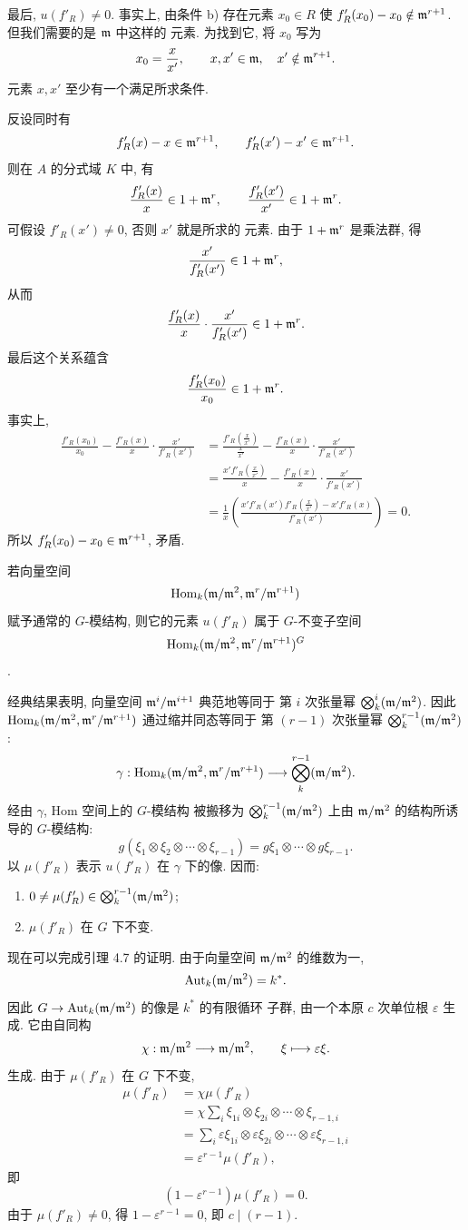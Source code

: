 最后, $u(f'_R)\ne0$. 事实上, 由条件 b) 存在元素
$x_0\in R$ 使 $f'_R(x_0)-x_0\notin\mathfrak m^{r+1}$. 但我们需要的是 $\mathfrak m$ 中这样的
元素. 为找到它, 将 $x_0$ 写为
\[
x_0=\frac{x}{x'},\qquad x,x'\in\mathfrak m,\quad x'\notin\mathfrak m^{r+1}.
\]
元素 $x,x'$ 至少有一个满足所求条件.

反设同时有
\[
f'_R(x)-x\in\mathfrak m^{r+1},
\qquad
f'_R(x')-x'\in\mathfrak m^{r+1}.
\]
则在 $A$ 的分式域 $K$ 中, 有
\[
\frac{f'_R(x)}{x}\in1+\mathfrak m^r,
\qquad
\frac{f'_R(x')}{x'}\in1+\mathfrak m^r.
\]
可假设 $f'_R(x')\ne0$, 否则 $x'$ 就是所求的
元素. 由于 $1+\mathfrak m^r$ 是乘法群, 得
\[
\frac{x'}{f'_R(x')}\in1+\mathfrak m^r,
\]
从而
\[
\frac{f'_R(x)}{x}\cdot\frac{x'}{f'_R(x')}\in1+\mathfrak m^r.
\]
最后这个关系蕴含
\[
\frac{f'_R(x_0)}{x_0}\in1+\mathfrak m^r.
\]
事实上,
\[
\begin{aligned}
\frac{f'_R(x_0)}{x_0}
-\frac{f'_R(x)}{x}\cdot\frac{x'}{f'_R(x')}
&=\frac{f'_R(\frac{x}{x'})}{\frac{x}{x'}}
-\frac{f'_R(x)}{x}\cdot\frac{x'}{f'_R(x')}\\
&=\frac{x'f'_R(\frac{x}{x'})}{x}
-\frac{f'_R(x)}{x}\cdot\frac{x'}{f'_R(x')}\\
&=\frac1x\left(
\frac{x'f'_R(x')f'_R(\frac{x}{x'})-x'f'_R(x)}
{f'_R(x')}\right)=0.
\end{aligned}
\]
所以 $f'_R(x_0)-x_0\in\mathfrak m^{r+1}$, 矛盾.

若向量空间
\[
\operatorname{Hom}_k(\mathfrak m/\mathfrak m^2,\mathfrak m^r/\mathfrak m^{r+1})
\]
赋予通常的 $G$-模结构, 则它的元素 $u(f'_R)$
属于 $G$-不变子空间
\[
\operatorname{Hom}_k(\mathfrak m/\mathfrak m^2,\mathfrak m^r/\mathfrak m^{r+1})^G
\]
.

经典结果表明, 向量空间 $\mathfrak m^i/\mathfrak m^{i+1}$ 典范地等同于
第 $i$ 次张量幂
$\bigotimes_k^i(\mathfrak m/\mathfrak m^2)$. 因此
$\operatorname{Hom}_k(\mathfrak m/\mathfrak m^2,\mathfrak m^r/\mathfrak m^{r+1})$ 通过缩并同态等同于
第 $(r-1)$ 次张量幂
$\bigotimes_k^{r-1}(\mathfrak m/\mathfrak m^2)$:
\[
\gamma:\operatorname{Hom}_k(\mathfrak m/\mathfrak m^2,\mathfrak m^r/\mathfrak m^{r+1})
\longrightarrow\bigotimes_k^{r-1}(\mathfrak m/\mathfrak m^2).
\]
经由 $\gamma$, Hom 空间上的 $G$-模结构
被搬移为 $\bigotimes_k^{r-1}(\mathfrak m/\mathfrak m^2)$ 上由
$\mathfrak m/\mathfrak m^2$ 的结构所诱导的 $G$-模结构:
\[
g(\xi_1\otimes\xi_2\otimes\cdots\otimes\xi_{r-1})
=g\xi_1\otimes\cdots\otimes g\xi_{r-1}.
\]
以 $\mu(f'_R)$ 表示 $u(f'_R)$ 在 $\gamma$ 下的像. 因而:
\begin{enumerate}
\item[I)] $0\ne\mu(f'_R)\in\bigotimes_k^{r-1}(\mathfrak m/\mathfrak m^2)$;
\item[II)] $\mu(f'_R)$ 在 $G$ 下不变.
\end{enumerate}

现在可以完成引理 4.7 的证明. 由于向量空间
$\mathfrak m/\mathfrak m^2$ 的维数为一,
\[
\operatorname{Aut}_k(\mathfrak m/\mathfrak m^2)=k^*.
\]
因此 $G\to\operatorname{Aut}_k(\mathfrak m/\mathfrak m^2)$ 的像是 $k^*$ 的有限循环
子群, 由一个本原 $c$ 次单位根
$\varepsilon$ 生成. 它由自同构
\[
\chi:\mathfrak m/\mathfrak m^2\longrightarrow\mathfrak m/\mathfrak m^2,
\qquad \xi\longmapsto\varepsilon\xi.
\]
生成. 由于 $\mu(f'_R)$ 在 $G$ 下不变,
\[
\begin{aligned}
\mu(f'_R)
&=\chi\mu(f'_R)\\
&=\chi\sum_i\xi_{1i}\otimes\xi_{2i}\otimes\cdots\otimes\xi_{r-1,i}\\
&=\sum_i\varepsilon\xi_{1i}\otimes\varepsilon\xi_{2i}
  \otimes\cdots\otimes\varepsilon\xi_{r-1,i}\\
&=\varepsilon^{r-1}\mu(f'_R),
\end{aligned}
\]
即
\[
(1-\varepsilon^{r-1})\mu(f'_R)=0.
\]
由于 $\mu(f'_R)\ne0$, 得
$1-\varepsilon^{r-1}=0$, 即 $c\mid(r-1)$.


